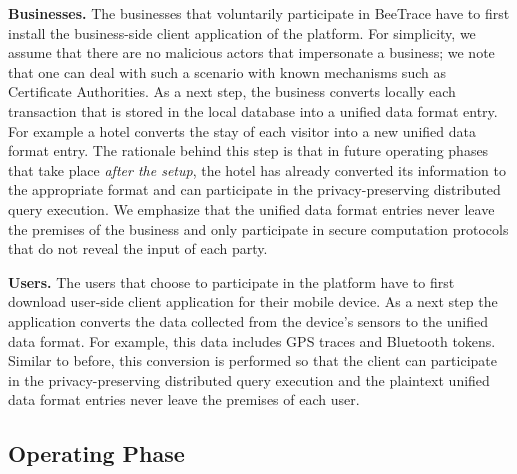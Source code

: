 \documentclass[11pt]{article}  %
\newcommand{\sysname}{\textsf{BeeTrace}\xspace}
\begin{document}
\textbf{Businesses. }The businesses that voluntarily participate in \sysname have to first install the business-side client application of the platform. For simplicity, we assume that there are no malicious actors that impersonate a business; we note that one can deal with such a scenario with known mechanisms such as Certificate Authorities.
As a next step, the business converts locally each transaction that is stored in the local database into a unified data format entry. 
For example a hotel converts the stay of each visitor into a new unified data format entry. 
The rationale behind this step is that in future operating phases that take place \emph{after the setup}, the hotel has already converted its information to the appropriate format and can participate in the privacy-preserving distributed query execution.  
We emphasize that the unified data format entries never leave the premises of the business and only participate in secure computation protocols that do not reveal the input of each party.



\textbf{Users. }The users that choose to participate in the platform have to first download user-side client application for their mobile device. As a next step the application converts the data collected from the device's sensors to the unified data format. 
For example, this data includes GPS traces and Bluetooth tokens. 
Similar to before, this conversion is performed so that the client can participate in the privacy-preserving distributed query execution and the plaintext unified data format entries never leave the premises of each user. 



\subsection{Operating Phase}
\end{document}
